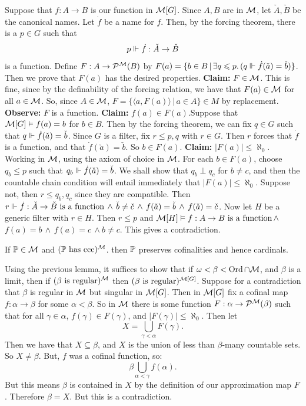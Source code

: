 \documentclass{article}
\begin{document}
    \proof Suppose that $f : A \to B$ is our function in $\mathcal{M}[G]$. Since $A, B$ are in $\mathcal{M}$, let $\check{A}, \check{B}$ be the canonical names. Let $\dot{f}$ be a name for $f$. Then, by the forcing theorem, there is a $p \in G$ such that \[ p \Vdash \dot{f} : \check{A} \to \check{B}\] is a function. \gap
    Define $F : A \to \mathcal{P}^{\mathcal{M}}(B)$ by $F(a) = \{ b \in B \, | \, \exists q \leqslant p. \, (q \Vdash \dot{f}(\check{a}) = \check{b}) \}$. Then we prove that $F(a)$ has the desired properties. \gap
    \textbf{Claim:} $F \in \mathcal{M}$. \gap
    This is fine, since by the definability of the forcing relation, we have that $F(a) \in \mathcal{M}$ for all $a \in \mathcal{M}$. So, since $A \in \mathcal{M}$, $F = \{ \langle a, F(a) \rangle \, | \, a \in A\} \in M$ by replacement. \gap
    \textbf{Observe:} $F$ is a function.\gap
    \textbf{Claim:} $f(a) \in F(a)$.\gap Suppose that $\mathcal{M}[G] \vDash f(a) = b$ for $b \in B$. Then by the forcing theorem, we can fix $q \in G$ such that $q \Vdash \dot{f}(\check{a})=\check{b}$. Since $G$ is a filter, fix $r \leq p, q$ with $r \in G$. Then $r$ forces that $\dot{f}$ is a function, and that $\dot{f}(\check{a})= \check{b}$. So $b \in F(a)$. \gap
    \textbf{Claim:} $|F(a)| \leq \aleph_{0}$.\gap
    Working in $\mathcal{M}$, using the axiom of choice in $\mathcal{M}$. For each $b \in F(a)$, choose $q_{b} \leq p$ such that $q_{b} \Vdash \dot{f}(\check{a})=\check{b}$. We shall show that $q_{b} \perp q_{c}$ for $b \neq c$, and then the countable chain condition will entail immediately that $|F(a)| \leq \aleph_{0}$. \gap
    Suppose not, then $r \leq q_{b},q_{c}$ since they are compatible. Then $r \Vdash \dot{f} : \check{A} \to \check{B} \text{ is a function}\, \wedge \, \check{b} \neq \check{c} \, \wedge \, f(\check{a})=\check{b} \, \wedge \, f(\check{a})=\check{c}$. Now let $H$ be a generic filter with $r \in H$. Then $r \leq p$ and $\mathcal{M}[H] \vDash f: A \to B \text{ is a function} \, \wedge \,$ $f(a)=b \, \wedge \, f(a)=c \, \wedge b \neq c$. This gives a contradiction.
    \endproof
    \begin{fancythm}{}
        If $\mathbb{P} \in \mathcal{M}$ and $(\mathbb{P} \text{ has ccc})^{\mathcal{M}}$. then $\mathbb{P}$ preserves cofinalities and hence cardinals.
    \end{fancythm}
    \proof Using the previous lemma, it suffices to show that if $\omega < \beta < \operatorname{Ord} \cap \mathcal{M}$, and $\beta$ is a limit, then if $(\text{$\beta$ is regular})^{\mathcal{M}}$ then $(\text{$\beta$ is regular})^{\mathcal{M}[G]}$. Suppose for a contradiction that $\beta$ is regular in $\mathcal{M}$ but singular in $\mathcal{M}[G]$. \gap Then in $\mathcal{M}[G]$ fix a cofinal map $f : \alpha \to \beta$ for some $\alpha < \beta$. So in $\mathcal{M}$ there is some function $F : \alpha \to \mathcal{P}^{\mathcal{M}}(\beta)$ such that for all $\gamma \in \alpha$, $f(\gamma) \in F(\gamma)$, and $|F(\gamma)| \leq \aleph_{0}$. Then let \[ X = \bigcup_{\gamma < \alpha} F(\gamma).\]
    Then we have that $X \subseteq \beta$, and $X$ is the union of less than $\beta$-many countable sets. So $X \neq \beta$. But, $f$ was a cofinal function, so: \[ \beta \bigcup_{\alpha < \gamma} f(\alpha). \] But this means $\beta$ is contained in $X$ by the definition of our approximation map $F$. Therefore $\beta = X$. But this is a contradiction. \endproof
\end{document}
